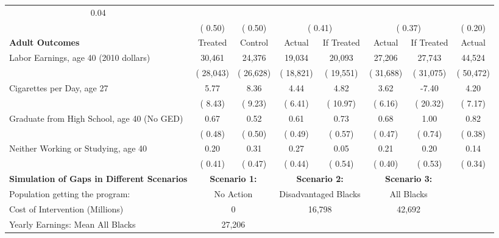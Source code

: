 \begin{table}[htbp]
\begin{center}
\begin{tabular}{lccccccc}
\multicolumn{1}{c}{         0.04} 
 \\[0.2cm]  
 & (        0.50) & (        0.50) & \multicolumn{2}{c}{(        0.41)} &
\multicolumn{2}{c}{(        0.37)} &
\multicolumn{1}{c}{(        0.20)} 
 \\[0.2cm]  
\hline
\textbf{Adult Outcomes} &Treated &Control  &Actual &If Treated &Actual &If Treated &Actual \\[0.2cm] 
Labor Earnings, age 40 (2010 dollars) &       30,461 &       24,376 &       19,034 &       20,093 &       27,206 &       27,743 &       44,524 \\[0.2cm]  
 & (      28,043) & (      26,628) & (      18,821) & (      19,551) & (      31,688) & (      31,075) & (      50,472) \\[0.2cm]  
Cigarettes per Day, age 27 &         5.77 &         8.36 &         4.44 &         4.82 &         3.62 &        -7.40 &         4.20 \\[0.2cm]  
 & (        8.43) & (        9.23) & (        6.41) & (       10.97) & (        6.16) & (       20.32) & (        7.17) \\[0.2cm]  
Graduate from High School, age 40 (No GED) &         0.67 &         0.52 &         0.61 &         0.73 &         0.68 &         1.00 &         0.82 \\[0.2cm]  
 & (        0.48) & (        0.50) & (        0.49) & (        0.57) & (        0.47) & (        0.74) & (        0.38) \\[0.2cm]  
Neither Working or Studying, age 40 &         0.20 &         0.31 &         0.27 &         0.05 &         0.21 &         0.20 &         0.14 \\[0.2cm]  
 & (        0.41) & (        0.47) & (        0.44) & (        0.54) & (        0.40) & (        0.53) & (        0.34) \\[0.2cm]  
\hline \hline
\textbf{Simulation of Gaps in Different Scenarios} & \multicolumn{2}{c}{\textbf{Scenario 1:}} & \multicolumn{2}{c}{\textbf{Scenario 2:}} & \multicolumn{2}{c}{\textbf{Scenario 3:}}   \\[0.2cm]  
 Population getting the program: & \multicolumn{2}{c}{No Action}   & \multicolumn{2}{c}{Disadvantaged Blacks} & \multicolumn{2}{c}{All Blacks}  \\[0.2cm]  
Cost of Intervention (Millions) &\multicolumn{2}{c}{           0} &
\multicolumn{2}{c}{      16,798} &
\multicolumn{2}{c}{      42,692} &
 \\[0.2cm]  
Yearly Earnings: Mean All Blacks &\multicolumn{2}{c}{      27,206} &

\end{tabular}
\end{center}
\end{table}
